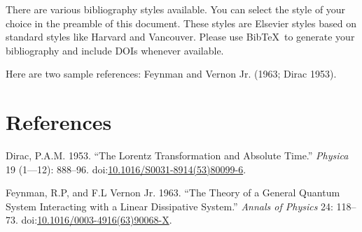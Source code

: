 \documentclass[]{elsarticle} %
\begin{document}
There are various bibliography styles available. You can select the
style of your choice in the preamble of this document. These styles are
Elsevier styles based on standard styles like Harvard and Vancouver.
Please use BibTeX~to generate your bibliography and include DOIs
whenever available.

Here are two sample references: Feynman and Vernon Jr. (1963; Dirac
1953).

\section*{References}\label{references}

\hypertarget{refs}{}
\hypertarget{ref-Dirac1953888}{}
Dirac, P.A.M. 1953. ``The Lorentz Transformation and Absolute Time.''
\emph{Physica} 19 (1---12): 888--96.
doi:\href{https://doi.org/10.1016/S0031-8914(53)80099-6}{10.1016/S0031-8914(53)80099-6}.

\hypertarget{ref-Feynman1963118}{}
Feynman, R.P, and F.L Vernon Jr. 1963. ``The Theory of a General Quantum
System Interacting with a Linear Dissipative System.'' \emph{Annals of
Physics} 24: 118--73.
doi:\href{https://doi.org/10.1016/0003-4916(63)90068-X}{10.1016/0003-4916(63)90068-X}.
\end{document}
